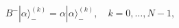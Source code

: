 \begin{equation}
B^-|\alpha\rangle_-^{(k)}=\alpha|\alpha\rangle_-^{(k)},
\quad k=0, \dots, N-1,
\label{coh1}\end{equation}

